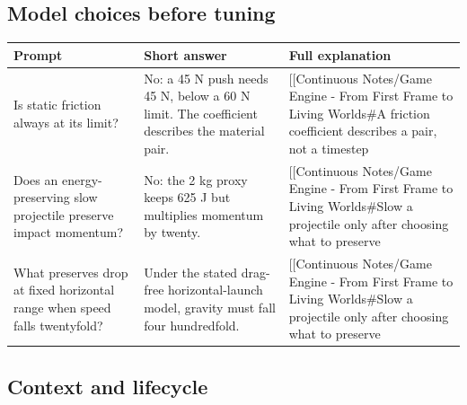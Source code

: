 \subsection{Model choices before tuning}\label{appendix-64ea716dcadc-model-choices-before-tuning}

\hypertarget{appendix-64ea716dcadc-model-choices-before-tuning}{}

{\def\LTcaptype{none} %
\begin{longtable}[]{@{}
  >{\raggedright\arraybackslash}p{}
  >{\raggedright\arraybackslash}p{}
  >{\raggedright\arraybackslash}p{}@{}}
\toprule\noalign{}
\begin{minipage}[b]{\linewidth}\raggedright
Prompt
\end{minipage} & \begin{minipage}[b]{\linewidth}\raggedright
Short answer
\end{minipage} & \begin{minipage}[b]{\linewidth}\raggedright
Full explanation
\end{minipage} \\
\midrule\noalign{}
\endhead
\bottomrule\noalign{}
\endlastfoot
Is static friction always at its limit? & No: a 45 N push needs 45 N, below a 60 N limit. The coefficient describes the material pair. & {[}{[}Continuous Notes/Game Engine - From First Frame to Living Worlds\#A friction coefficient describes a pair, not a timestep \\
Does an energy-preserving slow projectile preserve impact momentum? & No: the 2 kg proxy keeps 625 J but multiplies momentum by twenty. & {[}{[}Continuous Notes/Game Engine - From First Frame to Living Worlds\#Slow a projectile only after choosing what to preserve \\
What preserves drop at fixed horizontal range when speed falls twentyfold? & Under the stated drag-free horizontal-launch model, gravity must fall four hundredfold. & {[}{[}Continuous Notes/Game Engine - From First Frame to Living Worlds\#Slow a projectile only after choosing what to preserve \\
\end{longtable}
}

\subsection{Context and lifecycle}\label{appendix-64ea716dcadc-context-and-lifecycle}

